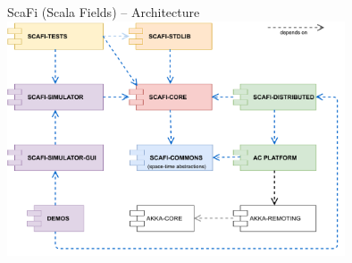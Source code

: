 \documentclass[presentation, 9pt]{beamer}\mode<presentation>{\usetheme{AMSBolognaFC}}
\begin{document}
\begin{frame}{ScaFi (Scala Fields) -- Architecture}
	\centering
	\includegraphics[width=10cm]{img/scafi-project-org.pdf}
\end{frame}
\end{document}
